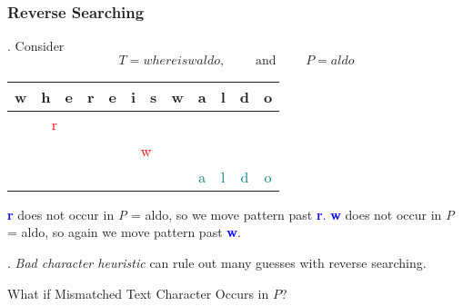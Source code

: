 \documentclass{article}
\begin{document}
\subsubsection{Reverse Searching}

\begin{examplee}.
    Consider 
    \[ T = whereiswaldo, \qquad \text{ and } \qquad P = aldo \]
    \begin{center}
        \begin{tabular}{|c|c|c|c|c|c|c|c|c|c|c|c|}
            \hline
            w & h & e & r & e & i & s & w & a & l & d & o \\ \hline
            \multicolumn{4}{|c|}{\qquad \qquad \quad \textcolor{red}{r}} & & & & & & & & \\ \hline
            & & & & \multicolumn{4}{|c|}{\qquad \qquad \quad \textcolor{red}{w}} & & & & \\ \hline
            & & & & & & & & \textcolor{teal}{a} & \textcolor{teal}{l} & \textcolor{teal}{d} & \textcolor{teal}{o} \\ \hline
        \end{tabular}
    \end{center}
    \textbf{\textcolor{blue}{r}} does not occur in \textit{P} = aldo, so we move pattern past \textbf{\textcolor{blue}{r}}. \textbf{\textcolor{blue}{w}} does not occur in \textit{P} = aldo, so again we move pattern past \textbf{\textcolor{blue}{w}}. 
    \begin{discovery}[].
        \textit{Bad character heuristic} can rule out many guesses with reverse searching. 
    \end{discovery}
\end{examplee}

\begin{Question}{}
    What if Mismatched Text Character Occurs in $P$?
\end{Question}
\end{document}
